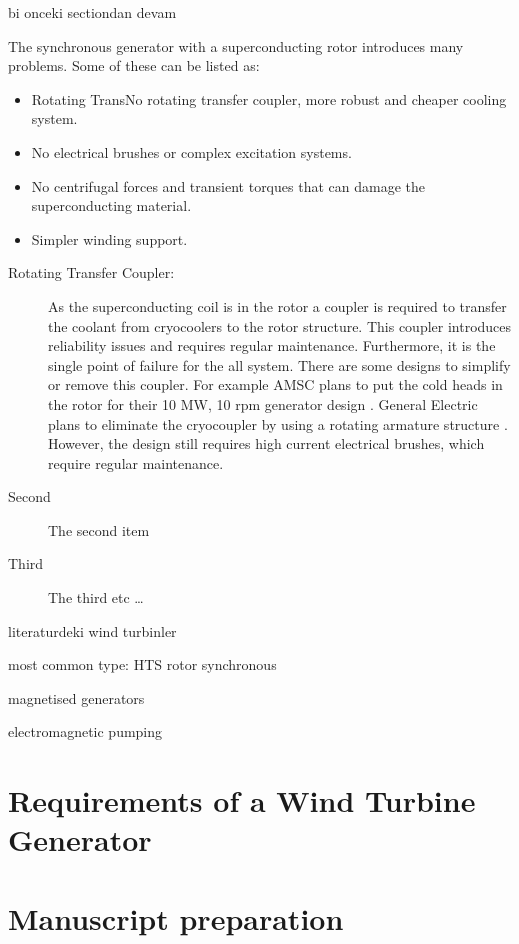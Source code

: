 \documentclass[12pt]{IET02}
\begin{document}
bi onceki sectiondan devam

The synchronous generator with a superconducting rotor introduces many problems. Some of these can be listed as:

\begin{itemize}
  \item Rotating TransNo rotating transfer coupler, more robust and cheaper cooling system.
  \item No electrical brushes or complex excitation systems.
  \item No centrifugal forces and transient torques that can damage the superconducting material.
  \item Simpler winding support.
\end{itemize}

\begin{description}
  \item[Rotating Transfer Coupler:] As the superconducting coil is in the rotor a coupler is required to transfer the coolant from cryocoolers to the rotor structure. This coupler introduces reliability issues and requires regular maintenance. Furthermore, it is the single point of failure for the all system. There are some designs to simplify or remove this coupler. For example AMSC plans to put the cold heads in the rotor for their 10 MW, 10 rpm generator design \cite{amsc_presentation}. General Electric plans to eliminate the cryocoupler by using a rotating armature structure \cite{Stautner2012}. However, the design still requires high current electrical brushes, which require regular maintenance.

  \item[Second] The second item
  \item[Third] The third etc \ldots
\end{description}

literaturdeki wind turbinler

most common type: HTS rotor synchronous

magnetised generators

electromagnetic pumping 

\section{Requirements of a Wind Turbine Generator}


\section{Manuscript preparation}
\end{document}
